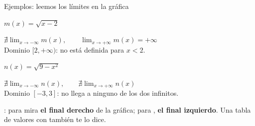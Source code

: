 \begin{fmexfill}{Ejemplos: leemos los límites en la gráfica}
\begin{minipage}[t][\tcbtextheight][s]{\linewidth}
\noindent \begin{minipage}[t]{0.48\linewidth}\centering $m(x)=\sqrt{x-2}$\par\smallskip {}\par\smallskip $\displaystyle\nexists\lim_{x\to-\infty}m(x),\qquad\lim_{x\to+\infty}m(x)=+\infty$\\ \vspace*{0.2cm} Dominio $[2,+\infty)$: no está definida para $x<2$.\end{minipage}\hfill\begin{minipage}[t]{0.48\linewidth}\centering $n(x)=\sqrt{9-x^2}$\par\smallskip {}\par\smallskip $\displaystyle\nexists\lim_{x\to-\infty}n(x),\qquad\nexists\lim_{x\to+\infty}n(x)$\\ \vspace*{0.2cm} Dominio $[-3,3]$: no llega a ninguno de los dos infinitos.\end{minipage}\par
\vfill

      
\begin{fmnote}: para  mira \textbf{el final derecho} de la gráfica; para , \textbf{el final izquierdo}. Una tabla de valores con  también te lo dice.\end{fmnote}
\end{minipage}
\end{fmexfill}
